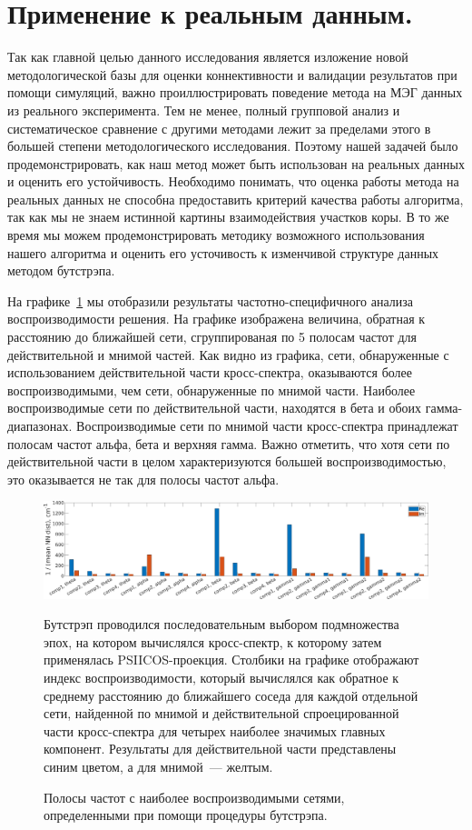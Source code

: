 \section{Применение к реальным данным.} Так как главной целью данного
исследования является изложение новой методологической базы для оценки
коннективности и валидации результатов при помощи симуляций, важно
проиллюстрировать поведение метода на МЭГ данных из реального эксперимента.
Тем не менее, полный групповой анализ и систематическое сравнение с другими
методами лежит за пределами этого в большей степени методологического исследования.
Поэтому нашей задачей было продемонстрировать, как наш метод может быть использован на
реальных данных и оценить его устойчивость.
Необходимо понимать, что оценка работы метода на
реальных данных не способна предоставить критерий качества работы алгоритма, так как
мы не знаем истинной картины взаимодействия участков коры. В то же время мы можем
продемонстрировать методику возможного использования нашего алгоритма и оценить
его усточивость к изменчивой структуре данных методом бутстрэпа.

На графике~\ref{fig:10} мы отобразили результаты частотно-специфичного
анализа воспроизводимости решения. На графике изображена величина, обратная к
расстоянию до ближайшей сети, сгруппированая по 5 полосам частот для
действительной и мнимой частей. Как видно из графика, сети, обнаруженные с
использованием действительной части кросс-спектра, оказываются более
воспроизводимыми, чем сети, обнаруженные по мнимой части. Наиболее воспроизводимые
сети по действительной части, находятся в бета и обоих гамма-диапазонах.
Воспроизводимые сети по мнимой части кросс-спектра принадлежат полосам частот
альфа, бета и верхняя гамма. Важно отметить, что хотя сети по действительной части
в целом характеризуются большей воспроизводимостью, это оказывается не так для
полосы частот альфа.

\begin{figure}[h!tpb]
 \includegraphics[width=1\textwidth]{../images/psiicos_paper/Figure10_hr.jpg}
 \caption{Полосы частот с наиболее воспроизводимыми сетями, определенными при помощи
 процедуры бутстрэпа.}\label{fig:10}
 Бутстрэп проводился последовательным выбором подмножества эпох, на котором
 вычислялся кросс-спектр, к которому затем применялась PSIICOS-проекция.
 Столбики на графике отображают индекс воспроизводимости, который вычислялся
 как обратное к среднему расстоянию до ближайшего соседа для каждой отдельной
 сети, найденной по мнимой и действительной спроецированной части кросс-спектра для четырех
 наиболее значимых главных компонент. Результаты для действительной части представлены
 синим цветом, а для мнимой~--- желтым.
 \end{figure} %


